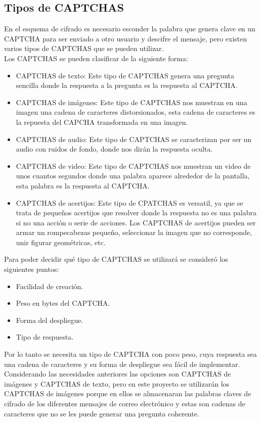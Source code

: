 \documentclass[12pt,oneside,onecolumn,openany]{report}
\begin{document}
\subsection{Tipos de CAPTCHAS}
En el esquema de cifrado es necesario esconder la palabra que genera clave en un CAPTCHA para ser enviado a otro usuario y descifre el mensaje, pero existen varios tipos de CAPTCHAS que se pueden utilizar\cite{cit}.\\Los CAPTCHAS se pueden clasificar de la siguiente forma:
\begin{itemize}
 \item CAPTCHAS de texto: Este tipo de CAPTCHAS genera una pregunta sencilla donde la respuesta a la pregunta es la respuesta al CAPTCHA.
 \item CAPTCHAS de imágenes: Este tipo de CAPTCHAS nos muestran en una imagen una cadena de caracteres distorsionados, esta cadena de caracteres es la repuesta del CAPCHA transformada en una imagen.
 \item CAPTCHAS de audio: Este tipo de CAPTCHAS se caracterizan por  ser un audio con ruidos de fondo, donde nos dirán la respuesta oculta.
 \item CAPTCHAS de video: Este tipo de CAPTCHAS nos muestran un video de unos cuantos segundos donde una palabra aparece alrededor de la pantalla, esta palabra es la respuesta al CAPTCHA.
 \item CAPTCHAS de acertijos: Este tipo de CPATCHAS es versatil, ya que se trata de pequeños acertijos que resolver donde la respuesta no es una palabra si no una acción o serie de acciones. Los CAPTCHAS de acertijos pueden ser armar un rompecabezas pequeño, seleccionar la imagen que no corresponde, unir figurar geométricas, etc. 
\end{itemize}
Para poder decidir qué tipo de CAPTCHAS se utilizará se consideró los siguientes puntos:
\begin{itemize}
 \item Facilidad de creación.
 \item Peso en bytes del CAPTCHA.
 \item Forma del despliegue.
 \item Tipo de respuesta.
\end{itemize}
Por lo tanto se necesita un tipo de CAPTCHA con poco peso, cuya respuesta sea una cadena de caracteres y su forma de despliegue sea fácil de implementar. \\
Considerando las necesidades anteriores las opciones son CAPTCHAS de imágenes y CAPTCHAS de texto, pero en este proyecto se utilizarán los CAPTCHAS de imágenes porque en ellos se almacenaran las palabras claves de cifrado de los diferentes mensajes de correo electrónico y estas son cadenas de caracteres que no se les puede generar una pregunta coherente. \\
\end{document}
